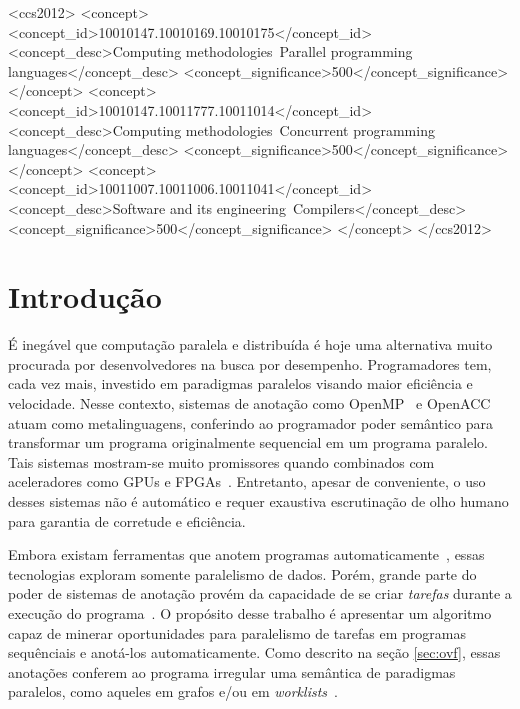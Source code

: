 \documentclass[sigconf]{acmart}
\begin{document}
 \begin{CCSXML}
<ccs2012>
<concept>
<concept_id>10010147.10010169.10010175</concept_id>
<concept_desc>Computing methodologies~Parallel programming languages</concept_desc>
<concept_significance>500</concept_significance>
</concept>
<concept>
<concept_id>10010147.10011777.10011014</concept_id>
<concept_desc>Computing methodologies~Concurrent programming languages</concept_desc>
<concept_significance>500</concept_significance>
</concept>
<concept>
<concept_id>10011007.10011006.10011041</concept_id>
<concept_desc>Software and its engineering~Compilers</concept_desc>
<concept_significance>500</concept_significance>
</concept>
</ccs2012>
\end{CCSXML}


\maketitle

\section{Introdu\c{c}\~{a}o}
\label{sec:intro}

É inegável que computação paralela e distribuída é hoje uma alternativa muito procurada por 
desenvolvedores na busca por desempenho. Programadores tem, cada vez mais, investido
em paradigmas paralelos visando maior eficiência e velocidade. Nesse contexto, sistemas de
anotação como OpenMP~\cite{JaegerCP15} e
OpenACC~\cite{OpenACC20} atuam como metalinguagens, conferindo ao programador
poder semântico para transformar um programa originalmente sequencial
em um programa paralelo. Tais sistemas mostram-se muito promissores quando
combinados com aceleradores como GPUs e FPGAs~\cite{Mendonca17,Poesia17}.
Entretanto, apesar de conveniente, o uso desses sistemas não é automático e
requer exaustiva escrutinação de olho humano para garantia de corretude e eficiência.

Embora existam ferramentas que anotem programas automaticamente~\cite{Mendonca16,Pingali11},
essas tecnologias exploram somente paralelismo de dados.  Porém, grande
parte do poder de sistemas de anotação provém da capacidade de se criar \textit{tarefas}
durante a execução do programa~\cite{Ayguade09}. O propósito desse trabalho
é apresentar um algoritmo capaz de minerar oportunidades para paralelismo de tarefas
em programas sequênciais e anotá-los automaticamente. Como descrito na seção \ref{sec:ovf},
essas anotações conferem ao programa irregular uma semântica de paradigmas paralelos,
como aqueles em grafos e/ou em \textit{worklists}~\cite{Pingali11}.
\end{document}
